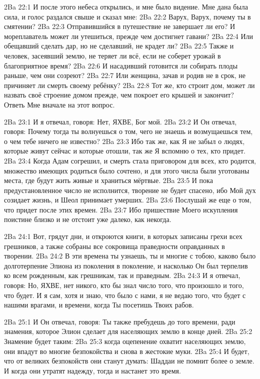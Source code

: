 \vs 2Ba 22:1
И после этого небеса открылись, и мне было видение. Мне дана была сила, и голос раздался свыше и сказал мне:
\vs 2Ba 22:2
Варух, Варух, почему ты в смятении?
\vs 2Ba 22:3
Отправившийся в путешествие не завершает ли его? И мореплаватель может ли утешиться, прежде чем достигнет гавани?
\vs 2Ba 22:4
Или обещавший сделать дар, но не сделавший, не крадет ли?
\vs 2Ba 22:5
Также и человек, засеявший землю, не теряет ли всё, если не соберет урожай в благоприятное время?
\vs 2Ba 22:6
И насадивший готовится ли собирать плоды раньше, чем они созреют?
\vs 2Ba 22:7
Или женщина, зачав и родив не в срок, не причиняет ли смерть своему ребёнку?
\vs 2Ba 22:8
Тот же, кто строит дом, может ли назвать своё строение домом прежде, чем покроет его крышей и закончит? Ответь Мне вначале на этот вопрос.

\vs 2Ba 23:1
И я отвечал, говоря: Нет, ЯХВЕ, Бог мой.
\vs 2Ba 23:2
И Он отвечал, говоря: Почему тогда ты волнуешься о том, чего не знаешь и возмущаешься тем, о чем тебе ничего не известно?
\vs 2Ba 23:3
Ибо так же, как Я не забыл о людях, которые живут сейчас и которые отошли, так же Я вспомню о тех, кто придет.
\vs 2Ba 23:4
Когда Адам согрешил, и смерть стала приговором для всех, кто родится, множество имеющих родиться было сочтено, и для этого числа были уготованы места, где будут жить живые и храниться мёртвые.
\vs 2Ba 23:5
И пока предустановленное число не исполнится, творение не будет спасено, ибо Мой дух созидает жизнь, и Шеол принимает умерших.
\vs 2Ba 23:6
Послушай же еще о том, что придет после этих времен.
\vs 2Ba 23:7
Ибо пришествие Моего искупления поистине близко и не отстоит уже далеко, как некогда.

\vs 2Ba 24:1
Вот, грядут дни, и откроются книги, в которых записаны грехи всех грешников, а также собраны все сокровища праведности оправданных в творении.
\vs 2Ba 24:2
В эти времена ты узнаешь, ты и многие с тобою, каково было долготерпение Элиона из поколения в поколение, и насколько Он был терпелив ко всем рожденным, как грешникам, так и праведным.
\vs 2Ba 24:3
И я отвечал, говоря: Но, ЯХВЕ, нет никого, кто бы знал число того, что произошло и того, что будет. И я сам, хотя и знаю, что было с нами, я не ведаю того, что будет с нашими врагами, и времени, когда Ты посетишь Твоих рабов.

\vs 2Ba 25:1
И Он отвечал, говоря: Ты также пребудешь до того времени, ради знамения, которое Элион сделает для населяющих землю в конце дней.
\vs 2Ba 25:2
Знамение будет таким:
\vs 2Ba 25:3
когда оцепенение охватит населяющих землю, они впадут во многие безпокойства и снова в жестокие муки.
\vs 2Ba 25:4
И будет, что от великих безпокойств они станут думать: Шаддаи не помнит более о земле. И когда они утратят надежду, тогда и настанет это время.

